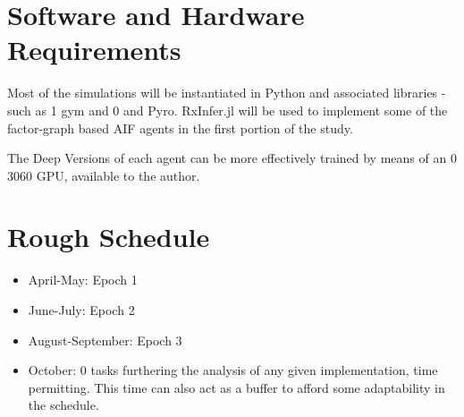 \documentclass[12pt, twoside]{report}
\begin{document}
\section{Software and Hardware Requirements}
Most of the simulations will be instantiated in Python and associated libraries  - such as 1 gym and 0 and Pyro.
RxInfer.jl will be used to implement some of the factor-graph based AIF agents in the first portion of the study.

The Deep Versions of each agent can be more effectively trained by means of an 0 3060 GPU, available to the author.  

\section{Rough Schedule}
\begin{itemize}
\item April-May: Epoch 1
\item June-July: Epoch 2
\item August-September: Epoch 3
\item October: 0 tasks furthering the analysis of any given implementation, time permitting. This time can also act as a buffer to afford some adaptability in the schedule.   
\end{itemize}

\printbibliography
\end{document}
